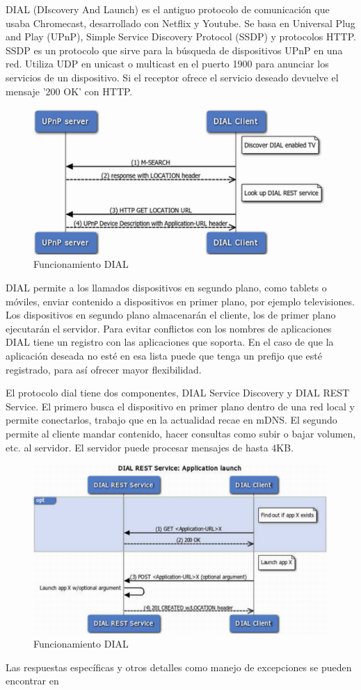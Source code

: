 DIAL (DIscovery And Launch) es el antiguo protocolo de comunicación que usaba Chromecast, desarrollado con Netflix y Youtube.
Se basa en Universal Plug and Play (UPnP), Simple Service Discovery Protocol (SSDP) y protocolos HTTP.
SSDP es un protocolo que sirve para la búsqueda de dispositivos UPnP en una red. Utiliza UDP en unicast o multicast en el puerto 1900 para anunciar los servicios de un dispositivo. Si el receptor ofrece el servicio deseado devuelve el mensaje '200 OK' con HTTP.


\begin{figure}[H]
	\centering
	\includegraphics[scale=0.5]{./Imagenes/dial.png}
	\caption{Funcionamiento DIAL}
	\label{fig:DIAL}
\end{figure}



DIAL permite a los llamados dispositivos en segundo plano, como tablets o móviles, enviar contenido a dispositivos en primer plano, por ejemplo televisiones.
Los dispositivos en segundo plano almacenarán el cliente, los de primer plano ejecutarán el servidor.
Para evitar conflictos con los nombres de aplicaciones DIAL tiene un registro con las aplicaciones que soporta. En el caso de que la aplicación deseada no esté en esa lista puede que tenga un prefijo que esté registrado, para así ofrecer mayor flexibilidad.

El protocolo dial tiene dos componentes, DIAL Service Discovery y DIAL REST Service.
El primero busca el dispositivo en primer plano dentro de una red local y permite conectarlos, trabajo que en la actualidad recae en mDNS.
El segundo permite al cliente mandar contenido, hacer consultas como subir o bajar volumen, etc. al servidor.
El servidor puede procesar mensajes de hasta 4KB.

\begin{figure}[H]
	\centering
	\includegraphics[scale=0.5]{./Imagenes/dialrest.png}
	\caption{Funcionamiento DIAL}
	\label{fig:DIAL}
\end{figure}


Las respuestas específicas y otros detalles como manejo de excepciones se pueden encontrar en \cite{dial}

